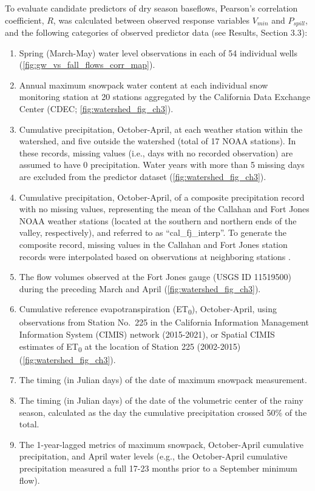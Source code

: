 \documentclass[hess, manuscript]{copernicus}
\providecommand{\tightlist}{%
  \setlength{\itemsep}{0pt}\setlength{\parskip}{0pt}}
\begin{document}
To evaluate candidate predictors of dry season baseflows, Pearson's
correlation coefficient, \(R\), was calculated between observed response
variables \(V_{min}\) and \(P_{spill}\), and the following categories of
observed predictor data (see Results, Section 3.3):

\begin{enumerate}
\def\labelenumi{\arabic{enumi}.}
\tightlist
\item
  Spring (March-May) water level observations in each of 54 individual
  wells (\autoref{fig:gw_vs_fall_flows_corr_map}).
\item
  Annual maximum snowpack water content at each individual snow
  monitoring station at 20 stations aggregated by the California Data
  Exchange Center (CDEC; \autoref{fig:watershed_fig_ch3}).
\item
  Cumulative precipitation, October-April, at each weather station
  within the watershed, and five outside the watershed (total of 17 NOAA
  stations). In these records, missing values (i.e., days with no
  recorded observation) are assumed to have 0 precipitation. Water years
  with more than 5 missing days are excluded from the predictor dataset
  (\autoref{fig:watershed_fig_ch3}).
\item
  Cumulative precipitation, October-April, of a composite precipitation
  record with no missing values, representing the mean of the Callahan
  and Fort Jones NOAA weather stations (located at the southern and
  northern ends of the valley, respectively), and referred to as
  ``cal\_fj\_interp''. To generate the composite record, missing values
  in the Callahan and Fort Jones station records were interpolated based
  on observations at neighboring stations \citep[see method
  in][]{Foglia2013a}.
\item
  The flow volumes observed at the Fort Jones gauge (USGS ID 11519500)
  during the preceding March and April
  (\autoref{fig:watershed_fig_ch3}).
\item
  Cumulative reference evapotranspiration (ET\textsubscript{0}),
  October-April, using observations from Station No.~225 in the
  California Information Management Information System (CIMIS) network
  (2015-2021), or Spatial CIMIS estimates of ET\textsubscript{0} at the
  location of Station 225 (2002-2015) (\autoref{fig:watershed_fig_ch3}).
\item
  The timing (in Julian days) of the date of maximum snowpack
  measurement.
\item
  The timing (in Julian days) of the date of the volumetric center of
  the rainy season, calculated as the day the cumulative precipitation
  crossed 50\% of the total.
\item
  The 1-year-lagged metrics of maximum snowpack, October-April
  cumulative precipitation, and April water levels (e.g., the
  October-April cumulative precipitation measured a full 17-23 months
  prior to a September minimum flow).
\end{enumerate}
\end{document}
